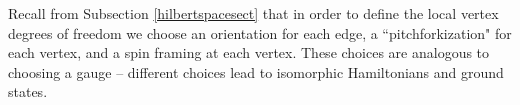 \documentclass[12pt,a4paper]{article}
\newcommand{\dave}[1]{{\color{ao(english)}\footnotesize{(DA) #1}}}
\newcommand{\kw}[1]{{\color{kwcolor}\footnotesize{(KW) #1}}}
\begin{document}
Recall from Subsection \ref{hilbertspacesect} that 
in order to define the local vertex degrees of freedom we choose an orientation for each edge, a ``pitchforkization" for each vertex, and a spin framing at each vertex.
These choices are analogous to choosing a gauge -- different choices lead to isomorphic Hamiltonians and ground states.

\end{document}
